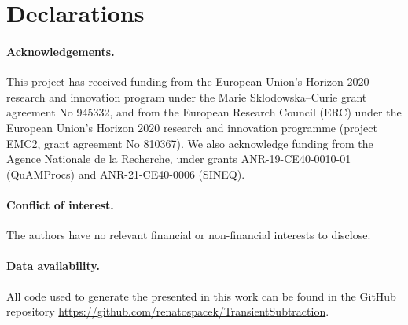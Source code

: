\documentclass[11pt]{article}
\theoremstyle{definition}
\let\oldparagraph=\paragraph
\renewcommand\paragraph[1]{\oldparagraph{#1.}}
\begin{document}
\section*{Declarations}
\paragraph{Acknowledgements} This project has received funding from the European Union's Horizon 2020 research and innovation program under the Marie Sklodowska--Curie grant agreement No 945332, and from the European Research Council (ERC) under the European Union's Horizon 2020 research and innovation programme (project EMC2, grant agreement No 810367). We also acknowledge funding from the Agence Nationale de la Recherche, under grants ANR-19-CE40-0010-01 (QuAMProcs) and ANR-21-CE40-0006 (SINEQ). 

\paragraph{Conflict of interest} The authors have no relevant financial or non-financial interests to disclose.

\paragraph{Data availability} All code used to generate the presented in this work can be found in the GitHub repository \url{https://github.com/renatospacek/TransientSubtraction}. 

\printbibliography
%
%
\end{document}
